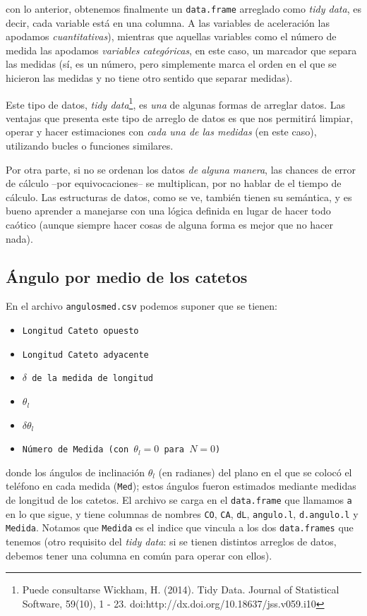 \documentclass[10pt,a4paper]{article}
\theoremstyle{definition}
\begin{document}
\noindent con lo anterior, obtenemos finalmente un \texttt{data.frame} arreglado como \textit{tidy data}, es decir, cada variable está en una columna. A las variables de aceleración las apodamos \textit{cuantitativas}), mientras que aquellas variables como el número de medida las apodamos \textit{variables categóricas}, en este caso, un marcador que separa las medidas (sí, es un número, pero simplemente marca el orden en el que se hicieron las medidas y no tiene otro sentido que separar medidas).

Este tipo de datos, \textit{tidy data}\footnote{Puede consultarse Wickham, H. (2014). Tidy Data. Journal of Statistical Software, 59(10), 1 - 23. doi:http://dx.doi.org/10.18637/jss.v059.i10}, es \textit{una} de algunas formas de arreglar datos. Las ventajas que presenta este tipo de arreglo de datos es que nos permitirá limpiar, operar y hacer estimaciones con \textit{cada una de las medidas} (en este caso), utilizando bucles o funciones similares.

Por otra parte, si no se ordenan los datos \textit{de alguna manera}, las chances de error de cálculo --por equivocaciones-- se multiplican, por no hablar de el tiempo de cálculo. Las estructuras de datos, como se ve, también tienen su semántica, y es bueno aprender a manejarse con una lógica definida en lugar de hacer todo caótico (aunque siempre hacer cosas de alguna forma es mejor que no hacer nada).




\subsection{Ángulo por medio de los catetos}

En el archivo \texttt{angulosmed.csv} podemos suponer que se tienen:

\begin{itemize}
\item \texttt{Longitud Cateto opuesto}
\item \texttt{Longitud Cateto adyacente}
\item \texttt{$\delta$ de la medida de longitud}
\item \texttt{$\theta_l$}
\item \texttt{$\delta \theta_l$}
\item \texttt{Número de Medida (con $\theta_l = 0$ para $N = 0$)}
\end{itemize}

\noindent donde los ángulos de inclinación $\theta_{l}$ (en radianes) del plano en el que se colocó el teléfono en cada medida (\texttt{Med}); estos ángulos fueron estimados mediante medidas de longitud de los catetos. El archivo se carga en el \texttt{data.frame} que llamamos \texttt{a} en lo que sigue, y tiene columnas de nombres \texttt{CO}, \texttt{CA}, \texttt{dL}, \texttt{angulo.l}, \texttt{d.angulo.l} y \texttt{Medida}. Notamos que \texttt{Medida} es el indice que vincula a los dos \texttt{data.frames} que tenemos (otro requisito del \textit{tidy data}: si se tienen distintos arreglos de datos, debemos tener una columna en común para operar con ellos).
\end{document}
